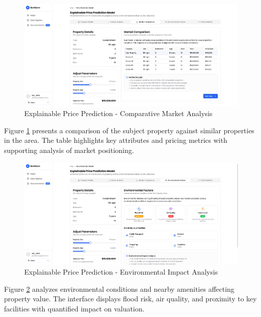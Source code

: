 \begin{figure}[h]
\centering
\includegraphics[width=1\textwidth]{assets/ui/explainable-market-comparison.png}
\caption{Explainable Price Prediction - Comparative Market Analysis}
\label{fig:explainable-market-comparison}
\end{figure}

Figure \ref{fig:explainable-market-comparison} presents a comparison of the subject property against similar properties in the area. The table highlights key attributes and pricing metrics with supporting analysis of market positioning.

\begin{figure}[h]
\centering
\includegraphics[width=1\textwidth]{assets/ui/explainable-environmental-factors.png}
\caption{Explainable Price Prediction - Environmental Impact Analysis}
\label{fig:explainable-environmental-factors}
\end{figure}

Figure \ref{fig:explainable-environmental-factors} analyzes environmental conditions and nearby amenities affecting property value. The interface displays flood risk, air quality, and proximity to key facilities with quantified impact on valuation.


